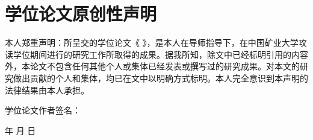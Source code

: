 \newpage
\pagestyle{plain}
\makeatletter
{}
\makeatother
\section*{\hspace*{\fill}学位论文原创性声明\hspace*{\fill}}
\makeatletter
{
	\kaishu{}\selectfont\setlength{\baselineskip}{20pt} 
	\vspace{11pt}
本人郑重声明：所呈交的学位论文《 \@cntitle》，是本人在导师指导下，在中国矿业大学攻读学位期间进行的研究工作所取得的成果。据我所知，除文中已经标明引用的内容外，本论文不包含任何其他个人或集体已经发表或撰写过的研究成果。对本文的研究做出贡献的个人和集体，均已在文中以明确方式标明。本人完全意识到本声明的法律结果由本人承担。
}
\makeatother

\vspace{24pt}

{ \hspace{0.44\textwidth} 学位论文作者签名：} \par 
{ \hspace{0.55\textwidth} 年 \qquad 月 \qquad 日}